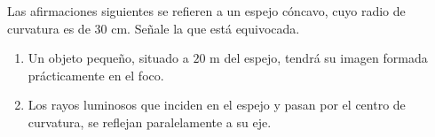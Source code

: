 
Las afirmaciones siguientes se refieren a un espejo cóncavo, cuyo radio de curvatura es de $30$ cm. Señale la que está equivocada.
\begin{enumerate}
    \item Un objeto pequeño, situado a $20$ m del espejo, tendrá su imagen formada prácticamente en el foco.
    \item Los rayos luminosos que inciden en el espejo y pasan por el centro de curvatura, se reflejan paralelamente a su eje.
\end{enumerate}